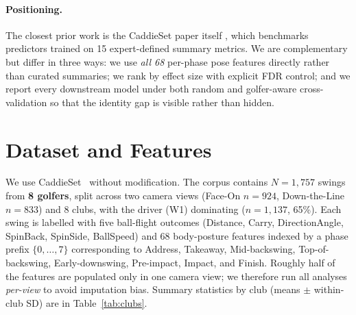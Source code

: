 \documentclass[11pt,a4paper]{article}
\begin{document}
\paragraph{Positioning.}
The closest prior work is the CaddieSet paper itself \citep{jung2025caddieset}, which benchmarks predictors
trained on 15 expert-defined summary metrics.  We are complementary but differ in three ways: we use \emph{all
68} per-phase pose features directly rather than curated summaries; we rank by effect size with explicit FDR
control; and we report every downstream model under both random and golfer-aware cross-validation so that the
identity gap is visible rather than hidden.

\section{Dataset and Features}
\label{sec:data}

We use CaddieSet~\citep{jung2025caddieset} without modification.  The corpus contains $N=1{,}757$ swings from
\textbf{8 golfers}, split across two camera views (Face-On $n=924$, Down-the-Line $n=833$) and 8 clubs, with the
driver (W1) dominating ($n=1{,}137$, 65\%).  Each swing is labelled with five ball-flight outcomes (Distance,
Carry, DirectionAngle, SpinBack, SpinSide, BallSpeed) and 68 body-posture features indexed by a phase prefix
$\{0,\dots,7\}$ corresponding to Address, Takeaway, Mid-backswing, Top-of-backswing, Early-downswing,
Pre-impact, Impact, and Finish.  Roughly half of the features are populated only in one camera view; we
therefore run all analyses \emph{per-view} to avoid imputation bias.  Summary statistics by club
(means $\pm$ within-club SD) are in Table~\ref{tab:clubs}.
\end{document}

